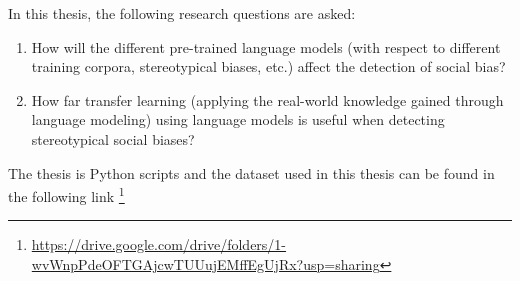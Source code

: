 In this thesis, the following research questions are asked:
\begin{enumerate}
    \item How will the different pre-trained language models (with respect to different training corpora, stereotypical biases, etc.) affect the detection of social bias?
    \item How far transfer learning (applying the real-world knowledge gained through language modeling) using language models is useful when detecting stereotypical social biases?
\end{enumerate}

The thesis is 
Python scripts and the dataset used in this thesis can be found in the following link \footnote{\url{https://drive.google.com/drive/folders/1-wvWnpPdeOFTGAjcwTUUujEMffEgUjRx?usp=sharing}}
